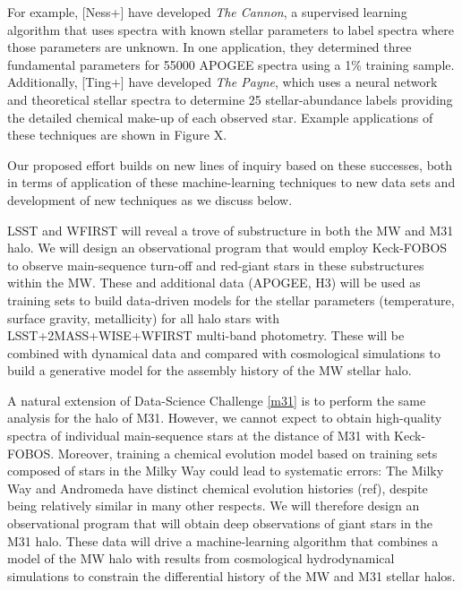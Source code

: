 \documentclass[oneside,11pt]{amsart}
\newcounter{chalno}
\newcommand{\chal}[1]{\refstepcounter{chalno}\label{#1}}
\begin{document}
For example, [Ness+] have developed {\it The Cannon}, a supervised
learning algorithm that uses spectra with known stellar parameters to
label spectra where those parameters are unknown.  In one application,
they determined three fundamental parameters for 55000 APOGEE spectra
using a 1\% training sample.  Additionally, [Ting+] have developed {\it
The Payne}, which uses a neural network and theoretical stellar spectra
to determine 25 stellar-abundance labels providing the detailed chemical
make-up of each observed star.  Example applications of these techniques
are shown in Figure X.

Our proposed effort builds on new lines of inquiry based on these
successes, both in terms of application of these machine-learning
techniques to new data sets and development of new techniques as we
discuss below.

\medskip \chal{mwhalo}  LSST and WFIRST will reveal a trove of substructure in
both the MW and M31 halo.  We will design an observational program that
would employ Keck-FOBOS to observe main-sequence turn-off and red-giant
stars in these substructures within the MW.  These and additional data
(APOGEE, H3) will be used as training sets to build data-driven models
for the stellar parameters (temperature, surface gravity, metallicity)
for all halo stars with LSST+2MASS+WISE+WFIRST multi-band photometry.
These will be combined with dynamical data and compared with
cosmological simulations to build a generative model for the assembly
history of the MW stellar halo.

\medskip \chal{m31}   A natural extension of
Data-Science Challenge \ref{m31} is to perform the same analysis for the
halo of M31.  However, we cannot expect to obtain high-quality spectra
of individual main-sequence stars at the distance of M31 with
Keck-FOBOS.  Moreover, training a chemical evolution model based on
training sets composed of stars in the Milky Way could lead to
systematic errors:  The Milky Way and Andromeda have distinct chemical
evolution histories (ref), despite being relatively similar in many
other respects.  We will therefore design an observational program that
will obtain deep observations of giant stars in the M31 halo.  These
data will drive a machine-learning algorithm that combines a model of
the MW halo with results from cosmological hydrodynamical simulations to
constrain the differential history of the MW and M31 stellar halos.
\end{document}
